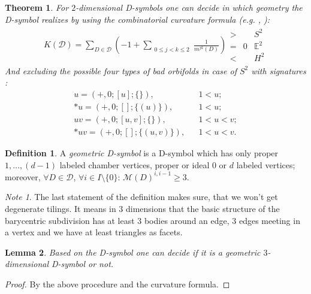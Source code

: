 \documentclass[12pt,a4paper]{article}
\numberwithin{equation}{section}
\theoremstyle{plain}%
\newtheorem{thm}{Theorem}[section]
\newtheorem{lem}[thm]{Lemma}
\theoremstyle{definition}
\newtheorem{defn}{Definition}[section]
\theoremstyle{remark}
\newtheorem*{note}{Note}
\begin{document}
\begin{thm}
  \label{thm:curvature}
  For $2$-dimensional D-symbols one can decide in which geometry the
  D-symbol realizes by using the {\em combinatorial curvature formula}
  (e.g. \cite{M96}, \cite{LMS94}):
  \begin{align*}
    K(\mathcal{D})=\sum_{D\in
    \mathcal{D}}\left(-1+\sum_{\substack{0\le j<k\le 2}}\frac{1}{m^{jk}(D)}\right)
    \begin{array}{cccc}
      > & & S^2 \\
      = & 0 & \mathbb{E}^2 \\
      < & & H^2
    \end{array}
  \end{align*}
  And excluding the possible four types of bad orbifolds in case of $S^2$ with 
  signatures \cite{Ma67}:
  \begin{align*}
    u=(+,0;[u];\{\}), & & 1<u;\\
    *u=(+,0;[];\{(u)\}), & & 1<u;\\
    uv=(+,0;[u,v];\{\}), & & 1<u<v;\\
    *uv=(+,0;[];\{(u,v)\}), & & 1<u<v.
  \end{align*}
\end{thm}

\begin{defn}
  \label{def:D-sym}
  A {\em geometric D-symbol} is a D-symbol which
  has only proper $1,\ldots,(d-1)$ labeled chamber vertices, proper or ideal $0$ or
  $d$ labeled vertices; moreover, $\forall D\in \mathcal{D}$, $\forall i\in
  I\setminus\{0\}$: $\mathcal{M}(D)^{i,i-1}\geq3$.
\end{defn}

\begin{note}
  The last statement of the definition makes sure, that we won't get degenerate
  tilings. It means in $3$ dimensions that the basic structure of the barycentric
  subdivision has at least 3 bodies around an edge, 3 edges meeting in a
  vertex and we have at least triangles as facets.
\end{note}

\begin{lem}
  Based on the D-symbol one can decide if it is a geometric $3$-dimensional
  D-symbol or not.
\end{lem}

\begin{proof}
  By the above procedure and the curvature formula.

%
\end{proof}
\end{document}
